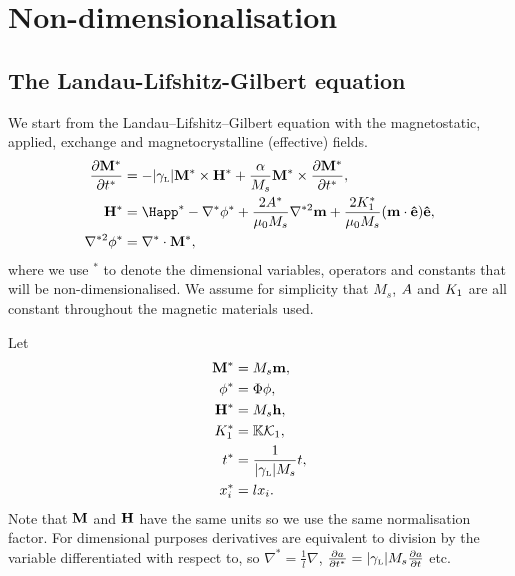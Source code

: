 \section{Non-dimensionalisation}
\label{sec:normalisations-appendix}



\subsection{The Landau-Lifshitz-Gilbert equation}
\label{sec:land-lifsh-gilb-normalisation}

We start from the Landau--Lifshitz--Gilbert equation with the magnetostatic, applied, exchange and magnetocrystalline (effective) fields. 
\begin{align}
  \pd{\Mv^*}{t^*} &= - \gymagc \Mv^* \times \Hv^* + \frac{\alpha}{M_s} \Mv^* \times \pd{\Mv^*}{t^*}, \label{eqn:llgnd} \\
  \Hv^* &= \Happ^* - \nabla^* \phi^* + \frac{2\Exchc^*}{\mu_0 M_s} \nabla^{*2} \mv + \frac{2\Kone^*}{\mu_0 M_s} (\mv \cdot \ev) \ev,
          \label{eqn:effnd} \\
  \nabla^{*2} \phi^* &= \nabla^* \cdot \Mv^*, \label{eqn:phind}
\end{align}
where we use $^*$ to denote the dimensional variables, operators and constants that will be non-dimensionalised. We assume for simplicity that $M_s$, $A$ and $K_1$ are all
constant throughout the magnetic materials used.

Let
\begin{equation}
  \label{eqn:nddefs}
  \begin{aligned}
    \mathbf{M}^* &= M_s \mathbf{m},  \\
    \phi^* &= \Phi \phi,  \\
    \mathbf{H}^* &= M_s \mathbf{h},  \\
    K_1^* &= \mathbb{K} \mathcal{K}_1,  \\
    t^* &= \frac{1}{{\left|{\gamma_{\text{\tiny{L}}}} \right|} M_s} t,  \\
    x_i^* &= l x_i. 
  \end{aligned}
\end{equation}
Note that $\mathbf{M}$ and $\mathbf{H}$ have the same units so we use the same normalisation factor. For dimensional purposes derivatives are equivalent to division by the variable differentiated with respect to, so $\nabla^* = \frac{1}{l} \nabla$, $\frac{\partial a}{\partial t^*} = {\left|{\gamma_{\text{\tiny{L}}}} \right|} M_s \frac{\partial a}{\partial t}$ etc.

